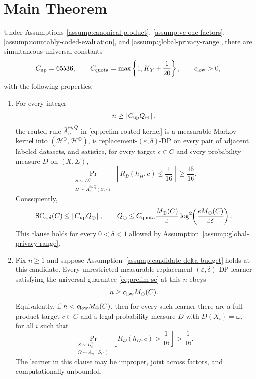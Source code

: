 \section{Main Theorem}\label{sec:main}

\begin{theorem}
\label{thm:main}
Under Assumptions~\ref{assump:canonical-product},
\ref{assump:vc-one-factors},
\ref{assump:countably-coded-evaluation}, and
\ref{assump:global-privacy-range}, there are simultaneous universal
constants
\[
C_{\rm up}=65536,
\qquad
C_{\rm quota}=\max\left\{1,K_Y+\frac1{20}\right\},
\qquad
c_{\rm low}>0,
\]
with the following properties.

\begin{enumerate}
\item For every integer
\[
n\ge\left\lceil C_{\rm up}Q_\oplus\right\rceil,
\]
the routed rule \(\bar A_n^{\oplus,Q}\) in
\eqref{eq:prelim-routed-kernel} is a measurable Markov kernel into
\((\mathcal H^\oplus,\mathscr H^\oplus)\), is
replacement-\((\varepsilon,\delta)\)-DP on every pair of adjacent
labeled datasets, and satisfies, for every target \(c\in C\) and every
probability measure \(D\) on \((X,\Sigma)\),
\begin{equation}\label{eq:main-upper-pac}
\Pr_{\substack{S\sim D_c^n\\
                \bar H\sim\bar A_n^{\oplus,Q}(S,\cdot)}}
\left[R_D(h_{\bar H},c)\le\frac1{16}\right]
\ge\frac{15}{16}.
\end{equation}
Consequently,
\begin{equation}\label{eq:main-upper-rate}
\operatorname{SC}_{\varepsilon,\delta}(C)
\le\left\lceil C_{\rm up}Q_\oplus\right\rceil,
\qquad
Q_\oplus
\le C_{\rm quota}
\frac{M_\oplus(C)}{\varepsilon}
\log^2\!\left(
\frac{eM_\oplus(C)}{\varepsilon\delta}
\right).
\end{equation}
This clause holds for every \(0<\delta<1\) allowed by
Assumption~\ref{assump:global-privacy-range}.

\item Fix \(n\ge1\) and suppose
Assumption~\ref{assump:candidate-delta-budget} holds at this candidate.
Every unrestricted measurable replacement-\((\varepsilon,\delta)\)-DP
learner satisfying the universal guarantee \eqref{eq:prelim-sc} at
this \(n\) obeys
\begin{equation}\label{eq:main-candidate-lower}
n\ge c_{\rm low}M_\oplus(C).
\end{equation}
Equivalently, if
\(n<c_{\rm low}M_\oplus(C)\), then for every such learner there are a
full-product target \(c\in C\) and a legal probability measure \(D\)
with \(D(X_i)=\omega_i\) for all \(i\) such that
\begin{equation}\label{eq:main-lower-witness}
\Pr_{\substack{S\sim D_c^n\\
                \Omega\sim A_n(S,\cdot)}}
\left[R_D(h_\Omega,c)>\frac1{16}\right]
>\frac1{16}.
\end{equation}
The learner in this clause may be improper, joint across factors, and
computationally unbounded.


\end{enumerate}
\end{theorem}

